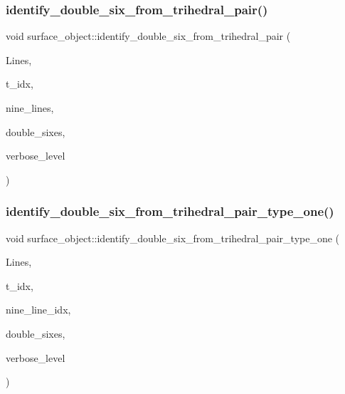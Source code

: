 \subsubsection{\texorpdfstring{identify\+\_\+double\+\_\+six\+\_\+from\+\_\+trihedral\+\_\+pair()}{identify\_double\_six\_from\_trihedral\_pair()}}
{\footnotesize\ttfamily void surface\+\_\+object\+::identify\+\_\+double\+\_\+six\+\_\+from\+\_\+trihedral\+\_\+pair (\begin{DoxyParamCaption}\item[{\mbox{\hyperlink{galois_8h_a09fddde158a3a20bd2dcadb609de11dc}{I\+NT}} $\ast$}]{Lines,  }\item[{\mbox{\hyperlink{galois_8h_a09fddde158a3a20bd2dcadb609de11dc}{I\+NT}}}]{t\+\_\+idx,  }\item[{\mbox{\hyperlink{galois_8h_a09fddde158a3a20bd2dcadb609de11dc}{I\+NT}} $\ast$}]{nine\+\_\+lines,  }\item[{\mbox{\hyperlink{galois_8h_a09fddde158a3a20bd2dcadb609de11dc}{I\+NT}} $\ast$}]{double\+\_\+sixes,  }\item[{\mbox{\hyperlink{galois_8h_a09fddde158a3a20bd2dcadb609de11dc}{I\+NT}}}]{verbose\+\_\+level }\end{DoxyParamCaption})}

\mbox{\label{classsurface__object_a651b603f3f6c59fc16cab70d07567a62}} 
\subsubsection{\texorpdfstring{identify\+\_\+double\+\_\+six\+\_\+from\+\_\+trihedral\+\_\+pair\+\_\+type\+\_\+one()}{identify\_double\_six\_from\_trihedral\_pair\_type\_one()}}
{\footnotesize\ttfamily void surface\+\_\+object\+::identify\+\_\+double\+\_\+six\+\_\+from\+\_\+trihedral\+\_\+pair\+\_\+type\+\_\+one (\begin{DoxyParamCaption}\item[{\mbox{\hyperlink{galois_8h_a09fddde158a3a20bd2dcadb609de11dc}{I\+NT}} $\ast$}]{Lines,  }\item[{\mbox{\hyperlink{galois_8h_a09fddde158a3a20bd2dcadb609de11dc}{I\+NT}}}]{t\+\_\+idx,  }\item[{\mbox{\hyperlink{galois_8h_a09fddde158a3a20bd2dcadb609de11dc}{I\+NT}} $\ast$}]{nine\+\_\+line\+\_\+idx,  }\item[{\mbox{\hyperlink{galois_8h_a09fddde158a3a20bd2dcadb609de11dc}{I\+NT}} $\ast$}]{double\+\_\+sixes,  }\item[{\mbox{\hyperlink{galois_8h_a09fddde158a3a20bd2dcadb609de11dc}{I\+NT}}}]{verbose\+\_\+level }\end{DoxyParamCaption})}

